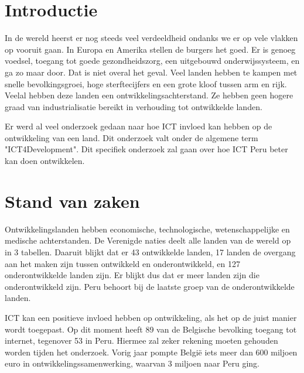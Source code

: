 
\section{Introductie} %
\label{sec:introductie}

In de wereld heerst er nog steeds veel verdeeldheid ondanks we er op vele vlakken op vooruit gaan. In Europa en Amerika stellen de burgers het goed. Er is genoeg voedsel, toegang tot goede gezondheidszorg, een uitgebouwd onderwijssysteem, en ga zo maar door. Dat is niet overal het geval. Veel landen hebben te kampen met snelle bevolkingsgroei, hoge sterftecijfers en een grote kloof tussen arm en rijk. Veelal hebben deze landen een ontwikkelingsachterstand. Ze hebben geen hogere graad van industrialisatie bereikt in verhouding tot ontwikkelde landen. 

Er werd al veel onderzoek gedaan naar hoe ICT invloed kan hebben op de ontwikkeling van een land. Dit onderzoek valt onder de algemene term "ICT4Development". Dit specifiek onderzoek zal gaan over hoe ICT Peru beter kan doen ontwikkelen. 


\section{Stand van zaken}
\label{sec:state-of-the-art}
Ontwikkelingslanden hebben economische, technologische, wetenschappelijke en medische achterstanden. De Verenigde naties deelt alle landen van de wereld op in 3 tabellen. Daaruit blijkt dat er 43 ontwikkelde landen, 17 landen de overgang aan het maken zijn tussen ontwikkeld en onderontwikkeld, en 127 onderontwikkelde landen zijn. \autocite{Nations2019} Er blijkt dus dat er meer landen zijn die onderontwikkeld zijn. Peru behoort bij de laatste groep van de onderontwikkelde landen. 

ICT kan een positieve invloed hebben op ontwikkeling, als het op de juist manier wordt toegepast. Op dit moment heeft 89 van de Belgische bevolking toegang tot internet, tegenover 53 in Peru. \cite{ITU2018} Hiermee zal zeker rekening moeten gehouden worden tijden het onderzoek. Vorig jaar pompte Belgi\"e iets meer dan 600 miljoen euro in ontwikkelingssamenwerking, waarvan  3 miljoen naar Peru ging. 

